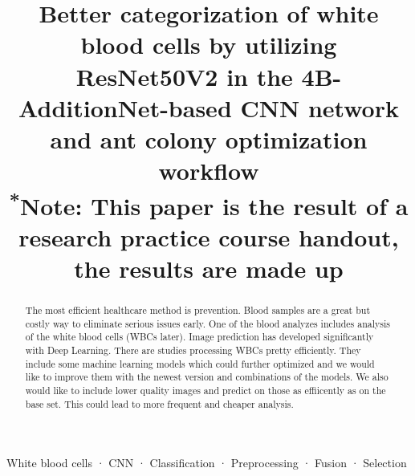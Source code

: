 \documentclass[conference]{IEEEtran}
\begin{document}
\title{Better categorization of white blood cells by utilizing ResNet50V2 in the
4B-AdditionNet-based CNN network and ant colony optimization workflow\\
{\footnotesize \textsuperscript{*}Note: This paper is the result of a research practice course handout, the results are made up}
}

\author{
\and
{}
\and
{}
\and
{}
}

\maketitle

\begin{abstract}
The most efficient healthcare method is prevention. Blood samples are a great but costly way to eliminate serious issues early. One of the blood analyzes includes analysis of the white blood cells (WBCs later). Image prediction has developed significantly with Deep Learning. There are studies processing WBCs pretty efficiently. They include some machine learning models which could further optimized and we would like to improve them with the newest version and combinations of the models. We also would like to include lower quality images and predict on those as effiicently as on the base set. This could lead to more frequent and cheaper analysis.
\end{abstract}

\begin{IEEEkeywords}
White blood cells · CNN · Classification · Preprocessing · Fusion · Selection
\end{IEEEkeywords}
\end{document}
